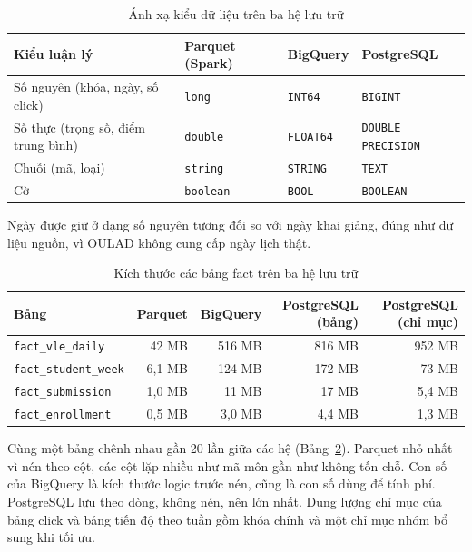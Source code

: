 \begin{table}[htbp]
\centering
\small
\begin{tabularx}{\textwidth}{|X|l|l|l|}
\hline
\textbf{Kiểu luận lý} & \textbf{Parquet (Spark)} & \textbf{BigQuery} & \textbf{PostgreSQL} \\ \hline
Số nguyên (khóa, ngày, số click) & \texttt{long} & \texttt{INT64} & \texttt{BIGINT} \\ \hline
Số thực (trọng số, điểm trung bình) & \texttt{double} & \texttt{FLOAT64} & \texttt{DOUBLE PRECISION} \\ \hline
Chuỗi (mã, loại) & \texttt{string} & \texttt{STRING} & \texttt{TEXT} \\ \hline
Cờ & \texttt{boolean} & \texttt{BOOL} & \texttt{BOOLEAN} \\ \hline
\end{tabularx}
\caption{Ánh xạ kiểu dữ liệu trên ba hệ lưu trữ}
\label{tab:kieu-du-lieu}
\end{table}

Ngày được giữ ở dạng số nguyên tương đối so với ngày khai giảng, đúng như dữ liệu nguồn, vì
OULAD không cung cấp ngày lịch thật.

\newpage

\begin{table}[htbp]
\centering
\small
\begin{tabular}{|l|r|r|r|r|}
\hline
\textbf{Bảng} & \textbf{Parquet} & \textbf{BigQuery} & \textbf{PostgreSQL (bảng)} & \textbf{PostgreSQL (chỉ mục)} \\ \hline
\texttt{fact\_vle\_daily} & 42 MB & 516 MB & 816 MB & 952 MB \\ \hline
\texttt{fact\_student\_week} & 6,1 MB & 124 MB & 172 MB & 73 MB \\ \hline
\texttt{fact\_submission} & 1,0 MB & 11 MB & 17 MB & 5,4 MB \\ \hline
\texttt{fact\_enrollment} & 0,5 MB & 3,0 MB & 4,4 MB & 1,3 MB \\ \hline
\end{tabular}
\caption{Kích thước các bảng fact trên ba hệ lưu trữ}
\label{tab:kich-thuoc}
\end{table}

Cùng một bảng chênh nhau gần 20 lần giữa các hệ (Bảng~\ref{tab:kich-thuoc}). Parquet nhỏ nhất vì nén theo cột, các cột lặp nhiều như mã môn gần như không tốn chỗ. Con số của BigQuery là kích thước logic trước nén, cũng là con số dùng để tính phí. PostgreSQL lưu theo dòng, không nén, nên lớn nhất. Dung lượng chỉ mục của bảng click và bảng tiến độ theo tuần gồm khóa chính và một chỉ mục nhóm bổ sung khi tối ưu.

